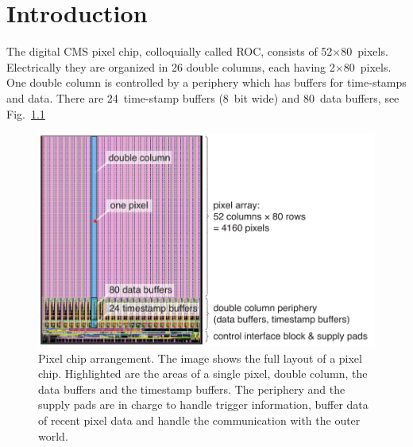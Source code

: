 \chapter{Introduction}

The digital CMS pixel chip, colloquially called \gls{ROC}, consists of 52$\times$80~pixels. Electrically they are organized in 26 double columns, each having 2$\times$80~pixels. One double column is controlled by a periphery which has buffers for time-stamps and data. There are 24~time-stamp buffers (8~bit wide) and 80~data buffers, see Fig.~\ref{fig:ROCimage}

\begin{figure}[hbtp]
	\begin{center}
	\includegraphics[width=.9\textwidth]{img/ROCimage.pdf}
	\end{center}
	\caption{Pixel chip arrangement. The image shows the full layout of a pixel chip. Highlighted are the areas of a single pixel, double column, the data buffers and the timestamp buffers. The periphery and the supply pads are in charge to handle trigger information, buffer data of recent pixel data and handle the communication with the outer world.}
	\label{fig:ROCimage}
\end{figure}

